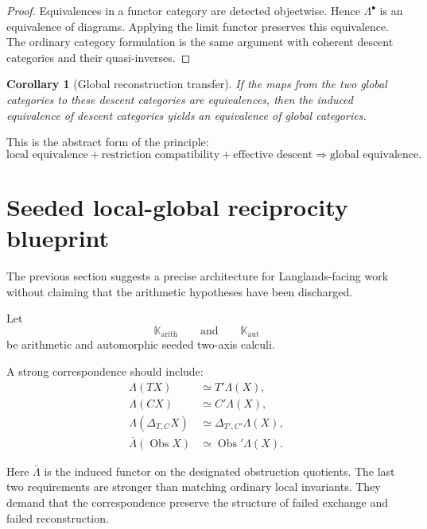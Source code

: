 \documentclass[11pt]{article}
\newtheorem{corollary}[theorem]{Corollary}
\theoremstyle{definition}
\theoremstyle{remark}
\newcommand{\Obs}{\operatorname{Obs}}
\begin{document}
\begin{proof}
Equivalences in a functor category are detected objectwise. Hence $\Lambda^\bullet$ is an equivalence of diagrams. Applying the limit functor preserves this equivalence. The ordinary category formulation is the same argument with coherent descent categories and their quasi-inverses.
\end{proof}

\begin{corollary}[Global reconstruction transfer]\label{cor:global-transfer}
If the maps from the two global categories to these descent categories are equivalences, then the induced equivalence of descent categories yields an equivalence of global categories.
\end{corollary}

This is the abstract form of the principle:
\[
\boxed{
\text{local equivalence}
+
\text{restriction compatibility}
+
\text{effective descent}
\Longrightarrow
\text{global equivalence}.
}
\]

\section{Seeded local-global reciprocity blueprint}

The previous section suggests a precise architecture for Langlands-facing work without claiming that the arithmetic hypotheses have been discharged.

Let
\[
\mathbb K_{\mathrm{arith}}
\qquad\text{and}\qquad
\mathbb K_{\mathrm{aut}}
\]
be arithmetic and automorphic seeded two-axis calculi.

A strong correspondence should include:
\begin{align*}
\Lambda(TX)&\simeq T'\Lambda(X),\\
\Lambda(CX)&\simeq C'\Lambda(X),\\
\Lambda(\Delta_{T,C}X)&\simeq\Delta_{T',C'}\Lambda(X),\\
\bar\Lambda(\Obs X)&\simeq\Obs'\Lambda(X).
\end{align*}

Here $\bar\Lambda$ is the induced functor on the designated obstruction quotients. The last two requirements are stronger than matching ordinary local invariants. They demand that the correspondence preserve the structure of failed exchange and failed reconstruction.
\end{document}
